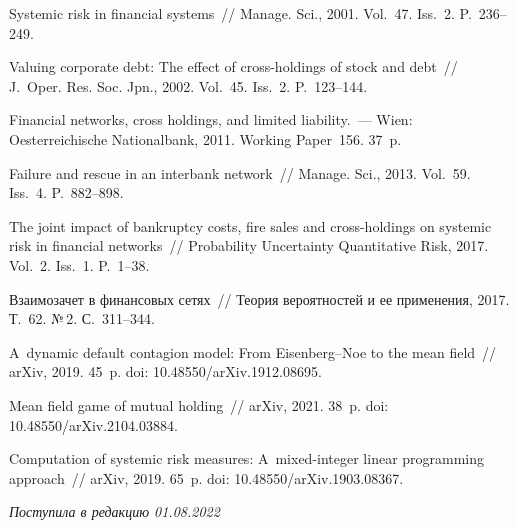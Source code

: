  \begin{multicols}{2}

\renewcommand{\bibname}{\protect\rmfamily Литература}

{\small\frenchspacing
{%
\begin{thebibliography}{9}


\vspace*{-2pt}

 Systemic risk in financial systems~// Manage. Sci., 2001.  Vol.~47. Iss.~2. P.~236--249.

 Valuing corporate debt: The effect of cross-holdings of stock and debt~// J.~Oper. Res. Soc. Jpn., 2002. Vol.~45. Iss.~2. P.~123--144.

 Financial networks, cross holdings, and limited liability.~---  Wien: Oesterreichische Nationalbank, 2011. 
 Working Paper~156. 37~p.
 
 Failure and rescue in an interbank network~// Manage. Sci., 2013. Vol.~59. Iss.~4. P.~882--898.

 The joint impact of bankruptcy costs, fire sales and cross-holdings on systemic risk in financial networks~// 
Probability Uncertainty Quantitative Risk, 2017.  Vol.~2. Iss.~1. P.~1--38.


 Взаимозачет в финансовых сетях~// Теория вероятностей и ее применения, 2017. Т.~62. №\,2. С.~311--344.

 A~dynamic default contagion model: From Eisenberg--Noe to the mean field~// arXiv, 2019. 45~p. doi: 10.48550/arXiv.1912.08695.

 Mean field game of mutual holding~// arXiv, 2021. 38~p. doi: 10.48550/arXiv.2104.03884.






 Computation of systemic risk measures: A~mixed-integer linear programming approach~// 
arXiv, 2019. 65~p. doi: 10.48550/arXiv.1903.08367.


\end{thebibliography}
}}
\end{multicols}

 \label{end\stat}

 \vspace*{-6pt}

\hfill{\small\textit{Поступила в редакцию  01.08.2022}}
\renewcommand{\figurename}{\protect\bf Рис.}
\renewcommand{\tablename}{\protect\bf Таблица}